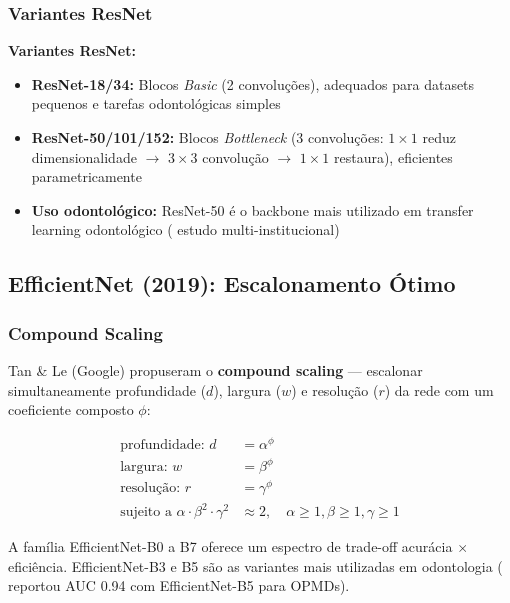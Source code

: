 \subsubsection{Variantes ResNet}

\textbf{Variantes ResNet:}
\begin{itemize}
  \item \textbf{ResNet-18/34:} Blocos \textit{Basic} (2 convoluções), adequados
        para datasets pequenos e tarefas odontológicas simples
  \item \textbf{ResNet-50/101/152:} Blocos \textit{Bottleneck} (3 convoluções:
        $1\times1$ reduz dimensionalidade $\to$ $3\times3$ convolução $\to$
        $1\times1$ restaura), eficientes parametricamente
  \item \textbf{Uso odontológico:} ResNet-50 é o backbone mais utilizado em
        transfer learning odontológico ( estudo multi-institucional)
\end{itemize}

\subsection{EfficientNet (2019): Escalonamento Ótimo}

\subsubsection{Compound Scaling}

Tan \& Le (Google) propuseram o \textbf{compound scaling} --- escalonar
simultaneamente profundidade ($d$), largura ($w$) e resolução ($r$) da rede
com um coeficiente composto $\phi$:

\begin{align}
  \text{profundidade: } d &= \alpha^\phi \label{eq:eff-depth} \\
  \text{largura: } w &= \beta^\phi \label{eq:eff-width} \\
  \text{resolução: } r &= \gamma^\phi \label{eq:eff-res} \\
  \text{sujeito a } \alpha \cdot \beta^2 \cdot \gamma^2 &\approx 2, \quad
    \alpha \geq 1, \beta \geq 1, \gamma \geq 1 \label{eq:eff-constraint}
\end{align}

A família EfficientNet-B0 a B7 oferece um espectro de trade-off acurácia $\times$
eficiência. EfficientNet-B3 e B5 são as variantes mais utilizadas em odontologia
( reportou AUC 0.94 com EfficientNet-B5 para OPMDs).

